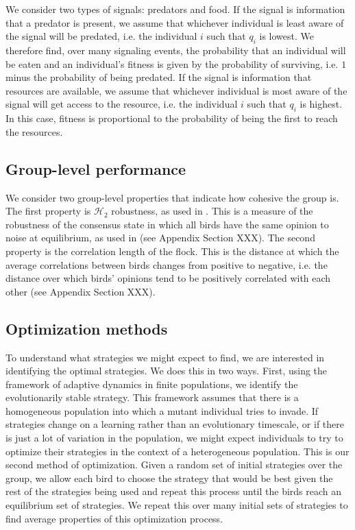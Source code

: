 \documentclass{article}
\begin{document}
We consider two types of signals: predators and food.  If the signal is information that a predator is present, we assume that whichever individual is least aware of the signal will be predated, i.e. the individual $i$ such that $q_i$ is lowest.  We therefore find, over many signaling events, the probability that an individual will be eaten and an individual's fitness is given by the probability of surviving, i.e. $1$ minus the probability of being predated.  If the signal is information that resources are available, we assume that whichever individual is most aware of the signal will get access to the resource, i.e. the individual $i$ such that $q_i$ is highest. In this case, fitness is proportional to the probability of being the first to reach the resources. 

\subsection{Group-level performance }
We consider two group-level properties that indicate how cohesive the group is.  The first property is $\mathscr{H}_2$ robustness, as used in \cite{Young:2010fk,Young:2013kx}. This is a measure of the robustness of the consensus state in which all birds have the same opinion to noise at equilibrium, as used in (see Appendix Section XXX). The second property is the correlation length of the flock. This is the distance at which the average correlations between birds changes from positive to negative, i.e. the distance over which birds' opinions tend to be positively correlated with each other (see Appendix Section XXX).

\subsection{Optimization methods }
To understand what strategies we might expect to find, we are interested in identifying the optimal strategies.  We does this in two ways.  First, using the framework of adaptive dynamics in finite populations, we identify the evolutionarily stable strategy.  This framework assumes that there is a homogeneous population into which a mutant individual tries to invade.  If strategies change on a learning rather than an evolutionary timescale, or if there is just a lot of variation in the population, we might expect individuals to try to optimize their strategies in the context of a heterogeneous population.  This is our second method of optimization. Given a random set of initial strategies over the group, we allow each bird to choose the strategy that would be best given the rest of the strategies being used and repeat this process until the birds reach an equilibrium set of strategies. We repeat this over many initial sets of strategies to find average properties of this optimization process.
\end{document}
